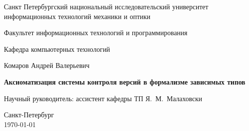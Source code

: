 \documentclass[a4paper]{report}
\theoremstyle{plain}
\theoremstyle{definition}
\begin{document}
\pagestyle{title}

\begin{center}
  Санкт Петербургский национальный исследовательский университет\\
  информационных технологий механики и оптики\\
  \hrulefill
 
\vspace{2cm}

Факультет информационных технологий и программирования

Кафедра компьютерных технологий

\vspace{3cm}

{\Large Комаров Андрей Валерьевич}

\vspace{2cm}

\vbox{\LARGE\bfseries Аксиоматизация системы контроля версий в
  формализме зависимых типов }

\vspace{4cm}

{\Large Научный руководитель: ассистент кафедры ТП Я.~М.~Малаховски}

\vspace{6cm}

Санкт-Петербург\\ \today
\end{center}


\newpage
\pagestyle{plain}

\tableofcontents

\startthechapters






\printbibliography
\end{document}
